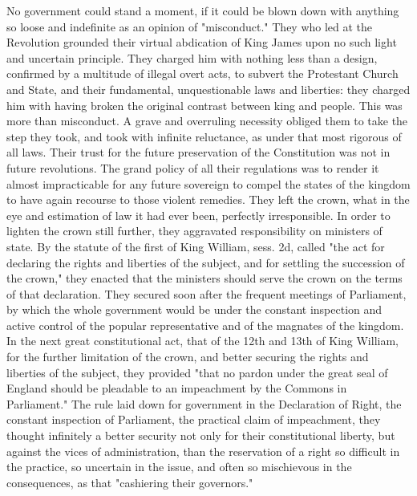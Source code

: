No government could stand a moment, if it could be blown down with anything so loose and indefinite as an opinion of "misconduct." They who led at the Revolution grounded their virtual abdication of King James upon no such light and uncertain principle. They charged him with nothing less than a design, confirmed by a multitude of illegal overt acts, to subvert the Protestant Church and State, and their fundamental, unquestionable laws and liberties: they charged him with having broken the original contrast between king and people. This was more than misconduct. A grave and overruling necessity obliged them to take the step they took, and took with infinite reluctance, as under that most rigorous of all laws. Their trust for the future preservation of the Constitution was not in future revolutions. The grand policy of all their regulations was to render it almost impracticable for any future sovereign to compel the states of the kingdom to have again recourse to those violent remedies. They left the crown, what in the eye and estimation of law it had ever been, perfectly irresponsible. In order to lighten the crown still further, they aggravated responsibility on ministers of state. By the statute of the first of King William, sess. 2d, called "the act for declaring the rights and liberties of the subject, and for settling the succession of the crown," they enacted that the ministers should serve the crown on the terms of that declaration. They secured soon after the frequent meetings of Parliament, by which the whole government would be under the constant inspection and active control of the popular representative and of the magnates of the kingdom. In the next great constitutional act, that of the 12th and 13th of King William, for the further limitation of the crown, and better securing the rights and liberties of the subject, they provided "that no pardon under the great seal of England should be pleadable to an impeachment by the Commons in Parliament." The rule laid down for government in the Declaration of Right, the constant inspection of Parliament, the practical claim of impeachment, they thought infinitely a better security not only for their constitutional liberty, but against the vices of administration, than the reservation of a right so difficult in the practice, so uncertain in the issue, and often so mischievous in the consequences, as that "cashiering their governors."

